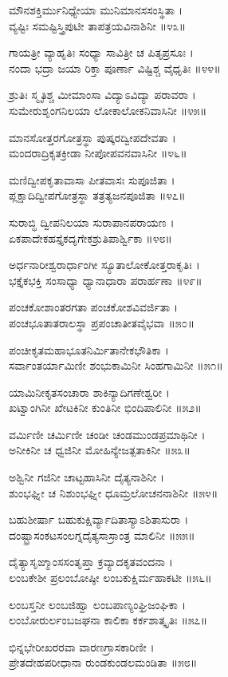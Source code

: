 ಮೌನಶಕ್ತಿರ್ಮುನಿಧ್ಯೇಯಾ ಮುನಿಮಾನಸಸಂಸ್ಥಿತಾ ।\\
ವ್ಯಷ್ಟಿಃ ಸಮಷ್ಟಿಸ್ತ್ರಿಪುಟೀ ತಾಪತ್ರಯವಿನಾಶಿನೀ ॥೪೩॥

ಗಾಯತ್ರೀ ವ್ಯಾಹೃತಿಃ ಸಂಧ್ಯಾ ಸಾವಿತ್ರೀ ಚ ಪಿತೃಪ್ರಸೂಃ ।\\
ನಂದಾ ಭದ್ರಾ ಜಯಾ ರಿಕ್ತಾ ಪೂರ್ಣಾ ವಿಷ್ಟಿಶ್ಚ ವೈಧೃತಿಃ ॥೪೪॥

ಶ್ರುತಿಃ ಸ್ಮೃತಿಶ್ಚ ಮೀಮಾಂಸಾ ವಿದ್ಯಾಽವಿದ್ಯಾ ಪರಾವರಾ ।\\
ಸುಮೇರುಶೃಂಗನಿಲಯಾ ಲೋಕಾಲೋಕನಿವಾಸಿನೀ ॥೪೫॥

ಮಾನಸೋತ್ತರಗೋತ್ರಸ್ಥಾ ಪುಷ್ಕರದ್ವೀಪದೇವತಾ ।\\
ಮಂದರಾದ್ರಿಕೃತಕ್ರೀಡಾ ನೀಪೋಪವನವಾಸಿನೀ ॥೪೬॥

ಮಣಿದ್ವೀಪಕೃತಾವಾಸಾ ಪೀತವಾಸಃ ಸುಪೂಜಿತಾ ।\\
ಪ್ಲಕ್ಷಾದಿದ್ವೀಪಗೋತ್ರಸ್ಥಾ ತತ್ರತ್ಯಜನಪೂಜಿತಾ ॥೪೭॥

ಸುರಾಬ್ಧಿ ದ್ವೀಪನಿಲಯಾ ಸುರಾಪಾನಪರಾಯಣ ।\\
ಏಕಪಾದೇಕಹಸ್ತೈಕದೃಗೇಕಶ್ರುತಿಪಾರ್ಶ್ವಿಕಾ ॥೪೮॥

ಅರ್ಧನಾರೀಶ್ವರಾರ್ಧಾಂಗೀ ಸ್ಯೂತಾಲೋಕೋತ್ತರಾಕೃತಿಃ ।\\
ಭಕ್ತೈಕಭಕ್ತಿ ಸಂಸಾಧ್ಯಾ ಧ್ಯಾನಾಧಾರಾ ಪರಾರ್ಹಣಾ ॥೪೯॥

ಪಂಚಕೋಶಾಂತರಗತಾ ಪಂಚಕೋಶವಿವರ್ಜಿತಾ ।\\
ಪಂಚಭೂತಾತರಾಲಸ್ಥಾ ಪ್ರಪಂಚಾತೀತವೈಭವಾ ॥೫೦॥

ಪಂಚೀಕೃತಮಹಾಭೂತನಿರ್ಮಿತಾನೇಕಭೌತಿಕಾ ।\\
ಸರ್ವಾಂತರ್ಯಾಮಿಣೀ ಶಂಭುಕಾಮಿನೀ ಸಿಂಹಗಾಮಿನೀ ॥೫೧॥

ಯಾಮಿನೀಕೃತಸಂಚಾರಾ ಶಾಕಿನ್ಯಾದಿಗಣೇಶ್ವರೀ ।\\
ಖಟ್ವಾಂಗಿನೀ ಖೇಟಕಿನೀ ಕುಂತಿನೀ ಭಿಂದಿಪಾಲಿನೀ ॥೫೨॥

ವರ್ಮಿಣೀ ಚರ್ಮಿಣೀ ಚಂಡೀ ಚಂಡಮುಂಡಪ್ರಮಾಥಿನೀ ।\\
ಅನೀಕಿನೀ ಚ ಧ್ವಜಿನೀ ಮೋಹಿನ್ಯೇಜತ್ಪತಾಕಿನೀ ॥೫೩॥

ಅಶ್ವಿನೀ ಗಜಿನೀ ಚಾಟ್ಟಹಾಸಿನೀ ದೈತ್ಯನಾಶಿನೀ ।\\
ಶುಂಭಘ್ನೀ ಚ ನಿಶುಂಭಘ್ನೀ ಧೂಮ್ರಲೋಚನನಾಶಿನೀ ॥೫೪॥

ಬಹುಶೀರ್ಷಾ ಬಹುಕುಕ್ಷಿರ್ವ್ಯಾದಿತಾಸ್ಯಾಽಶಿತಾಸುರಾ ।\\
ದಂಷ್ಟ್ರಾಸಂಕಟಸಂಲಗ್ನದೈತ್ಯಸಾಸ್ರಾಂತ್ರ ಮಾಲಿನೀ ॥೫೫॥

ದೈತ್ಯಾಸೃಙ್ಮಾಂಸಸಂತೃಪ್ತಾ ಕ್ರವ್ಯಾದಕೃತವಂದನಾ ।\\
ಲಂಬಕೇಶೀ ಪ್ರಲಂಬೋಷ್ಠೀ ಲಂಬಕುಕ್ಷಿರ್ಮಹಾಕಟೀ ॥೫೬॥

ಲಂಬಸ್ತನೀ ಲಂಬಜಿಹ್ವಾ ಲಂಬಪಾಣ್ಯಂಘ್ರಿಜಂಘಿಕಾ ।\\
ಲಂಬೋರುರ್ಲಂಬಜಘನಾ ಕಾಲಿಕಾ ಕರ್ಕಶಾತ್ಕೃತಿಃ ॥೫೭॥

ಭಿನ್ನಭೇರೀಖರರವಾ ವಾರಣಗ್ರಾಸಕಾರಿಣೀ ।\\
ಪ್ರೇತದೇಹಪರೀಧಾನಾ ರುಂಡಕುಂಡಲಮಂಡಿತಾ ॥೫೮॥


